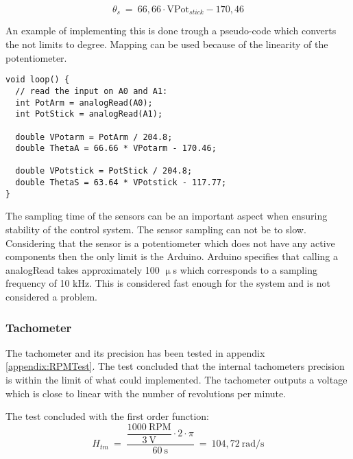 \begin{equation}
\theta_s\ =\ 66,66 \cdot \text{VPot}_{stick} - 170,46
\end{equation}

\startexplain
\stopexplain

An example of implementing this is done trough a pseudo-code which converts the not limits to degree. Mapping can be used because of the linearity of the potentiometer.
\begin{lstlisting}
void loop() {
  // read the input on A0 and A1:
  int PotArm = analogRead(A0);
  int PotStick = analogRead(A1);

  double VPotarm = PotArm / 204.8;
  double ThetaA = 66.66 * VPotarm - 170.46;
  
  double VPotstick = PotStick / 204.8;
  double ThetaS = 63.64 * VPotstick - 117.77;
}
\end{lstlisting}    

The sampling time of the sensors can be an important aspect when ensuring stability of the control system. The sensor sampling can not be to slow. Considering that the sensor is a potentiometer which does not have any active components then the only limit is the Arduino. Arduino specifies that calling a analogRead takes approximately 100 $\upmu$s which corresponds to a sampling frequency of 10 kHz. This is considered fast enough for the system and is not considered a problem. 

\subsubsection*{Tachometer}
The tachometer and its precision has been tested in appendix \ref{appendix:RPMTest}. The test concluded that the internal tachometers precision is within the limit of what could implemented. The tachometer outputs a voltage which is close to linear with the number of revolutions per minute.

The test concluded with the first order function:
\begin{equation}
H_{tm}\ =\ \dfrac{\dfrac{1000\ \text{RPM}}{3\ \text{V}} \cdot 2 \cdot \pi}{60\ \text{s}}\ =\ 104,72\ \text{rad/s}
\end{equation}


